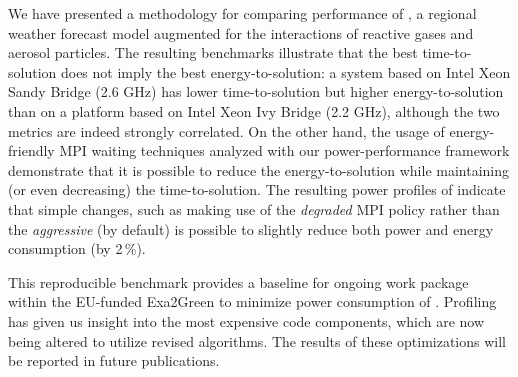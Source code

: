 We  have   presented  a  methodology  for   comparing  performance  of
\cosmoart,  a  regional  weather  forecast  model  augmented  for  the
interactions of  reactive gases and aerosol  particles.  The resulting
benchmarks illustrate  that the  best time-to-solution does  not imply
the best energy-to-solution: a system based on Intel Xeon Sandy Bridge
(2.6  GHz) has  lower time-to-solution  but  higher energy-to-solution
than on a platform based on  Intel Xeon Ivy Bridge (2.2 GHz), although
the two  metrics are indeed  strongly correlated.  On the  other hand,
the usage of energy-friendly  MPI waiting techniques analyzed with our
power-per\-for\-man\-ce framework  demonstrate that it  is possible to
reduce the  energy-to-solution while maintaining  (or even decreasing)
the  time-to-so\-lu\-tion. The resulting  power profiles  of \cosmoart
indicate   that    simple   changes,    such   as   making    use   of
the \emph{degraded}  MPI policy rather than  the \emph{aggressive} (by
default)  is  possible  to  slightly  reduce  both  power  and  energy
consumption (by 2\,\%).

This  reproducible  benchmark provides  a  baseline  for ongoing  work
package within  the EU-funded Exa2Green to  minimize power consumption
of \cosmoart. Profiling  has given us insight into  the most expensive
code  components,  which are  now  being  altered  to utilize  revised
algorithms.  The  results of these  optimizations will be  reported in
future publications.
